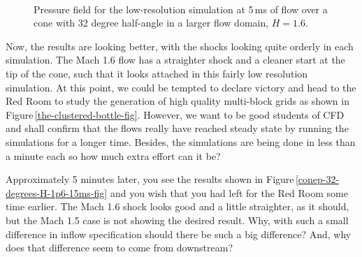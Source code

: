 \begin{figure}[htbp]
\begin{center}
\\
\end{center}
\caption{Pressure field for the low-resolution simulation at 5\,ms
         of flow over a cone with 32 degree half-angle
         in a larger flow domain, $H=1.6$.}
\label{conep-32-degrees-H-1p6-5ms-fig}
\end{figure}

\medskip
Now, the results are looking better, with the shocks looking quite orderly in each simulation.
The Mach 1.6 flow has a straighter shock and a cleaner start at the tip of the cone, 
such that it looks attached in this fairly low resolution simulation.
At this point, we could be tempted to declare victory and head to the Red Room 
to study the generation of high quality multi-block grids 
as shown in Figure\,\ref{the-clustered-bottle-fig}.
However, we want to be good students of CFD and shall confirm that the flows 
really have reached steady state by running the simulations for a longer time.
Besides, the simulations are being done in less than a minute each
so how much extra effort can it be?

\medskip
Approximately 5 minutes later, you see the results shown 
in Figure\,\ref{conep-32-degrees-H-1p6-15ms-fig} and you wish that you had left for the Red Room some 
time earlier.
The Mach 1.6 shock looks good and a little straighter, as it should,
but the Mach 1.5 case is not showing the desired result.
Why, with such a small difference in inflow specification should there be such a big difference?
And, why does that difference seem to come from downstream?

